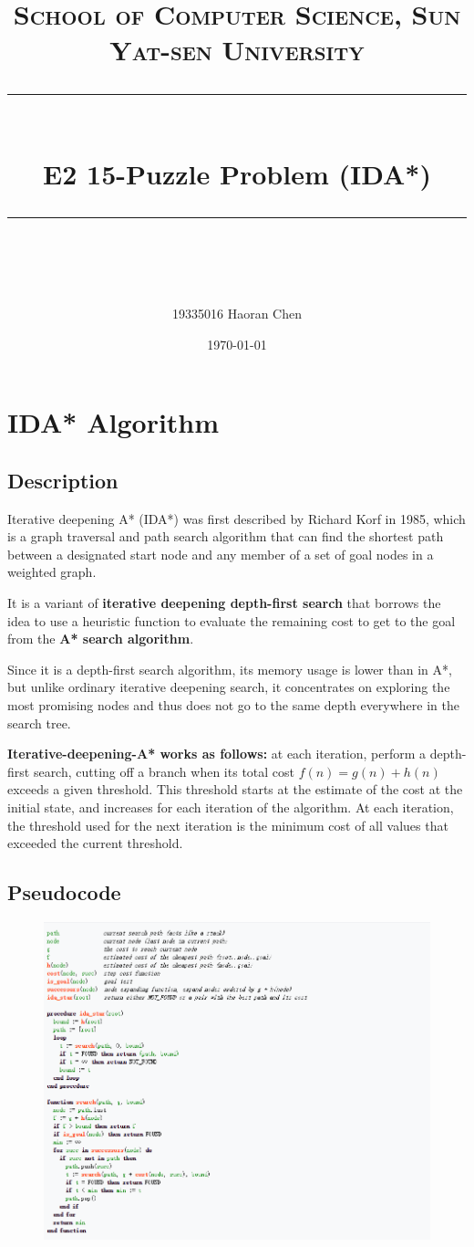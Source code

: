 \documentclass[a4paper, 11pt]{article}
\title{	
\normalfont \normalsize
\textsc{School of Computer Science, Sun Yat-sen University} \\ [25pt] %
\rule{\textwidth}{0.5pt} \\[0.4cm] %
\huge  E2 15-Puzzle Problem (IDA*)\\ %
\rule{\textwidth}{2pt} \\[0.5cm] %
\author{19335016 Haoran Chen}
\date{\normalsize\today}
}
\begin{document}
\maketitle
\tableofcontents
\newpage

\section{IDA* Algorithm}
\subsection{Description}
Iterative deepening A* (IDA*) was first described by Richard Korf in 1985, which is a graph traversal and path search algorithm that can find the shortest path between a designated start node and any member of a set of goal nodes in a weighted graph. 

It is a variant of \textbf{iterative deepening depth-first search} that borrows the idea to use a heuristic function to evaluate the remaining cost to get to the goal from the \textbf{A* search algorithm}. 

Since it is a depth-first search algorithm, its memory usage is lower than in A*, but unlike ordinary iterative deepening search, it concentrates on exploring the most promising nodes and thus does not go to the same depth everywhere in the search tree. 

\textbf{Iterative-deepening-A* works as follows:} at each iteration, perform a depth-first search, cutting off a branch when its total cost $f(n)=g(n)+h(n)$ exceeds a given threshold. This threshold starts at the estimate of the cost at the initial state, and increases for each iteration of the algorithm. At each iteration, the threshold used for the next iteration is the minimum cost of all values that exceeded the current threshold.
\subsection{Pseudocode}
\begin{figure}[ht]
\centering
\includegraphics[width=17.3cm]{Pic/code}
\end{figure}
\end{document}
